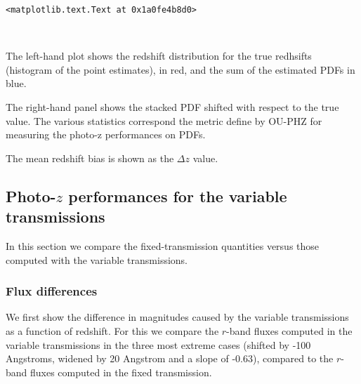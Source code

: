 \documentclass{article}
\begin{document}
    

    
    
    \begin{verbatim}
<matplotlib.text.Text at 0x1a0fe4b8d0>
    \end{verbatim}

    

    \begin{center}
    \end{center}
    { \hspace*{\fill} \\}
    
    The left-hand plot shows the redshift distribution for the true
redhsifts (histogram of the point estimates), in red, and the sum of the
estimated PDFs in blue.

The right-hand panel shows the stacked PDF shifted with respect to the
true value. The various statistics correspond the metric define by
OU-PHZ for measuring the photo-z performances on PDFs.

The mean redshift bias is shown as the \(\Delta z\) value.

\hypertarget{photo-z-performances-for-the-variable-transmissions}{%
\subsection{\texorpdfstring{Photo-\(z\) performances for the variable
transmissions}{Photo-z performances for the variable transmissions}}\label{photo-z-performances-for-the-variable-transmissions}}

In this section we compare the fixed-transmission quantities versus
those computed with the variable transmissions.

\hypertarget{flux-differences}{%
\subsubsection{Flux differences}\label{flux-differences}}

We first show the difference in magnitudes caused by the variable
transmissions as a function of redshift. For this we compare the
\(r\)-band fluxes computed in the variable transmissions in the three
most extreme cases (shifted by -100 Angstroms, widened by 20 Angstrom
and a slope of -0.63), compared to the \(r\)-band fluxes computed in the
fixed transmission.


    \begin{center}
    \end{center}
    { \hspace*{\fill} \\}
    
\end{document}
